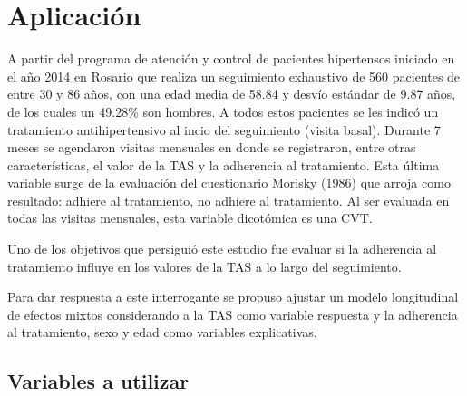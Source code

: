 \documentclass[spanish]{article}
\numberwithin{figure}{subsection}
\numberwithin{equation}{subsection}
\numberwithin{table}{subsection}
\def\npatients{560}
\begin{document}
\newpage

\section{Aplicación}

A partir del programa de atención y control de pacientes hipertensos iniciado en
el año 2014 en Rosario que realiza un seguimiento exhaustivo de \npatients{}
pacientes de entre 30 y 86 años, con una edad media de 58.84 y desvío estándar
de 9.87 años, de los cuales un 49.28\% son hombres. A todos estos pacientes se
les indicó un tratamiento antihipertensivo al incio del seguimiento (visita
basal). Durante 7 meses se agendaron visitas mensuales en donde se registraron,
entre otras características, el valor de la TAS y la adherencia al tratamiento.
Esta última variable surge de la evaluación del cuestionario Morisky (1986) que
arroja como resultado: adhiere al tratamiento, no adhiere al tratamiento. Al ser
evaluada en todas las visitas mensuales, esta variable dicotómica es una CVT.

Uno de los objetivos que persiguió este estudio fue evaluar si la adherencia al
tratamiento influye en los valores de la TAS a lo largo del seguimiento.

Para dar respuesta a este interrogante se propuso ajustar un modelo longitudinal
de efectos mixtos considerando a la TAS como variable respuesta y la adherencia
al tratamiento, sexo y edad como variables explicativas.

\subsection{Variables a utilizar}
\end{document}
